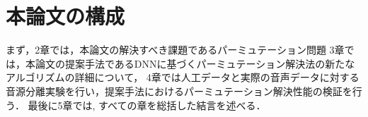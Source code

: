 \section{本論文の構成}
まず，2章では，本論文の解決すべき課題であるパーミュテーション問題
3章では，本論文の提案手法であるDNNに基づくパーミュテーション解決法の新たなアルゴリズムの詳細について，
4章では人工データと実際の音声データに対する音源分離実験を行い，提案手法におけるパーミュテーション解決性能の検証を行う．
最後に5章では, すべての章を総括した結言を述べる．


